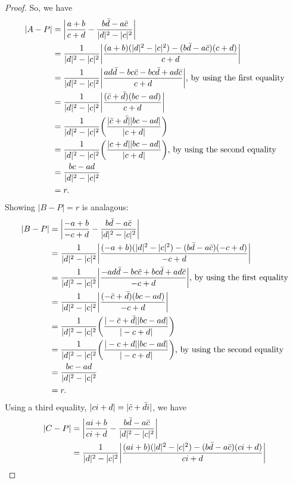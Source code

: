 \begin{proof}
So, we have
\begin{align*}
|A-P| 	&= \biggl\lvert\frac{a+b}{c+d} - \frac{b\bar{d} - a\bar{c}}{|d|^2 - |c|^2}\biggr\rvert \\
		&= \frac{1}{|d|^2 - |c|^2} \biggl\lvert\frac{(a+b)(|d|^2-|c|^2) - (b\bar{d} - a\bar{c})(c+d)}{c+d}\biggr\rvert \\
		&= \frac{1}{|d|^2 - |c|^2} \biggl\lvert\frac{ad\bar{d} - bc\bar{c} - bc\bar{d} + ad\bar{c}}{c+d}\biggr\rvert \textrm{, by using the first equality}\\
		&= \frac{1}{|d|^2 - |c|^2} \biggl\lvert\frac{(\bar{c}+\bar{d})(bc - ad)}{c+d}\biggr\rvert \\
		&= \frac{1}{|d|^2 - |c|^2} \biggl(\frac{|\bar{c}+\bar{d}||bc - ad|}{|c+d|}\biggr) \\
		&= \frac{1}{|d|^2 - |c|^2} \biggl(\frac{|c+d||bc - ad|}{|c+d|}\biggr) \textrm{, by using the second equality} \\
		&= \frac{bc - ad}{|d|^2 - |c|^2} \\
		&= r.
\end{align*}
Showing $|B-P| = r$ is analagous:
\begin{align*}
|B-P| 	&= \biggl\lvert\frac{-a+b}{-c+d} - \frac{b\bar{d} - a\bar{c}}{|d|^2 - |c|^2}\biggr\rvert \\
		&= \frac{1}{|d|^2 - |c|^2} \biggl\lvert\frac{(-a+b)(|d|^2-|c|^2) - (b\bar{d} - a\bar{c})(-c+d)}{-c+d}\biggr\rvert \\
		&= \frac{1}{|d|^2 - |c|^2} \biggl\lvert\frac{-ad\bar{d} - bc\bar{c} + bc\bar{d} + ad\bar{c}}{-c+d}\biggr\rvert \textrm{, by using the first equality}\\
		&= \frac{1}{|d|^2 - |c|^2} \biggl\lvert\frac{(-\bar{c}+\bar{d})(bc - ad)}{-c+d}\biggr\rvert \\
		&= \frac{1}{|d|^2 - |c|^2} \biggl(\frac{|-\bar{c}+\bar{d}||bc - ad|}{|-c+d|}\biggr) \\
		&= \frac{1}{|d|^2 - |c|^2} \biggl(\frac{|-c+d||bc - ad|}{|-c+d|}\biggr) \textrm{, by using the second equality} \\
		&= \frac{bc - ad}{|d|^2 - |c|^2} \\
		&= r.
\end{align*}
Using a third equality, $|ci + d| = |\bar{c} + \bar{di}|$, we have
\begin{align*}
|C-P| 	&= \biggl\lvert\frac{ai+b}{ci+d} - \frac{b\conj{d} - a\conj{c}}{|d|^2 - |c|^2}\biggr\rvert \\
		&= \frac{1}{|d|^2 - |c|^2} \biggl\lvert\frac{(ai+b)(|d|^2-|c|^2) - (b\conj{d} - a\conj{c})(ci+d)}{ci+d}\biggr\rvert \\

\end{align*}
\end{proof}
